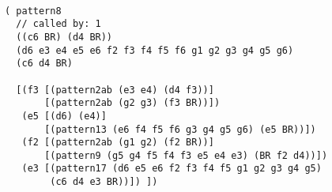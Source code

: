 {\Large\bf
\ \hfill 
\begin{verbatim}
( pattern8
  // called by: 1
  ((c6 BR) (d4 BR))
  (d6 e3 e4 e5 e6 f2 f3 f4 f5 f6 g1 g2 g3 g4 g5 g6)
  (c6 d4 BR)

  [(f3 [(pattern2ab (e3 e4) (d4 f3))]
       [(pattern2ab (g2 g3) (f3 BR))])
   (e5 [(d6) (e4)]
       [(pattern13 (e6 f4 f5 f6 g3 g4 g5 g6) (e5 BR))])
   (f2 [(pattern2ab (g1 g2) (f2 BR))]
       [(pattern9 (g5 g4 f5 f4 f3 e5 e4 e3) (BR f2 d4))])
   (e3 [(pattern17 (d6 e5 e6 f2 f3 f4 f5 g1 g2 g3 g4 g5) 
        (c6 d4 e3 BR))]) ])
\end{verbatim}
\hfill \  
}
